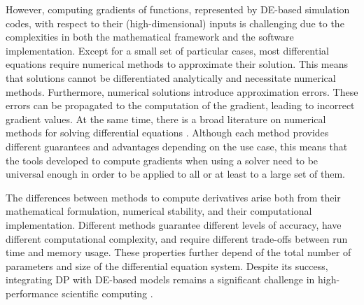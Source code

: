 However, computing gradients of functions, represented by DE-based simulation codes, with respect to their (high-dimensional) inputs is challenging due to the complexities in both the mathematical framework and the software implementation.
Except for a small set of particular cases, most differential equations require numerical methods to approximate their solution.
This means that solutions cannot be differentiated analytically and necessitate numerical methods. 
Furthermore, numerical solutions introduce approximation errors. 
These errors can be propagated to the computation of the gradient, leading to incorrect gradient values. 
At the same time, there is a broad literature on numerical methods for solving differential equations \cite{hairer-solving-1, hairer-solving-2}. 
Although each method provides different guarantees and advantages depending on the use case, this means that the tools developed to compute gradients when using a solver need to be universal enough in order to be applied to all or at least to a large set of them. 

The differences between methods to compute derivatives arise both from their mathematical formulation, numerical stability, and their computational implementation. 
Different methods guarantee different levels of accuracy, have different computational complexity, and require different trade-offs between run time and memory usage. 
These properties further depend of the total number of parameters and size of the differential equation system. 
Despite its success, integrating DP with DE-based models remains a significant challenge in high-performance scientific computing \cite{Naumann.2011}.

